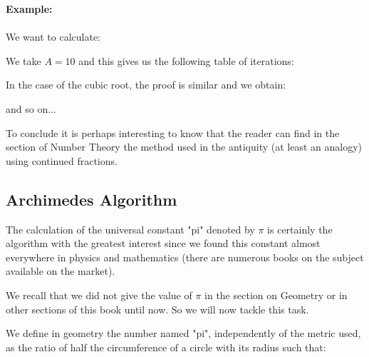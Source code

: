 		\begin{tcolorbox}[colframe=black,colback=white,sharp corners]
\textbf{{\Large {}}Example:}\\\\
We want to calculate:
	
	We take $A=10$ and this gives us the following table of iterations:
	
			
	\end{tcolorbox}

	In the case of the cubic root, the proof is similar and we obtain:
	
	
	and so on...
	
	To conclude it is perhaps interesting to know that the reader can find in the section of Number Theory the method used in the antiquity (at least an analogy) using continued fractions.
	
		\pagebreak
		\subsection{Archimedes Algorithm}
	
	The calculation of the universal constant "pi" denoted by $\pi$ is certainly the algorithm with the greatest interest since we found this constant almost everywhere in physics and mathematics (there are numerous books on the subject available on the market).
	
	We recall that we did not give the value of $\pi$ in the section on Geometry or in other sections of this book until now. So we will now tackle this task.
	
	We define in geometry the number named "pi", independently of the metric used, as the ratio of half the circumference of a circle with its radius such that:
	
